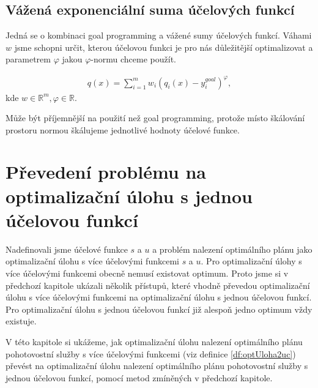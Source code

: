 \subsection{Vážená exponenciální suma účelových funkcí}\label{kap:vazenaSumUcF}

Jedná se o kombinaci goal programming a vážené sumy účelových funkcí.
Váhami $w$ jsme schopni určit, kterou účelovou funkci je pro nás důležitější optimalizovat a parametrem $\varphi$ jakou $\varphi$-normu chceme použít.

\begin{definice}\label{df:vazenaSumUcF}
  \begin{align*}
    q(x) = \sum_{i=1}^{m} w_i (q_i(x) - y_i^{goal})^\varphi,
  \end{align*}
  kde $w \in \mathbb{R}^m, \varphi \in \mathbb{R}$.
\end{definice}

Může být příjemnější na použití než goal programming, protože místo škálování prostoru normou škálujeme jednotlivé hodnoty účelové funkce.

\section{Převedení problému na optimalizační úlohu s jednou účelovou funkcí}\label{kap:opt1Uc}

Nadefinovali jsme účelové funkce $s$ a $u$ a problém nalezení optimálního plánu jako optimalizační úlohu s více účelovými funkcemi $s$ a $u$.
Pro optimalizační úlohy s více účelovými funkcemi obecně nemusí existovat optimum.
Proto jsme si v předchozí kapitole ukázali několik přístupů,
které vhodně převedou optimalizační úlohu s více účelovými funkcemi na optimalizační úlohu s jednou účelovou funkcí.
Pro optimalizační úlohu s jednou účelovou funkcí již alespoň jedno optimum vždy existuje.

V této kapitole si ukážeme, jak optimalizační úlohu nalezení optimálního plánu pohotovostní služby s více účelovými funkcemi (viz definice \ref{df:optUloha2uc}) převést na
optimalizační úlohu nalezení optimálního plánu pohotovostní služby s jednou účelovou funkcí, pomocí metod zmíněných v předchozí kapitole.

